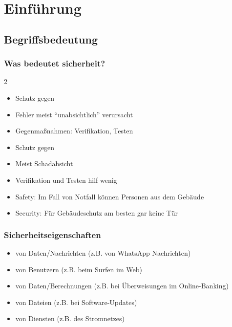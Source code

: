 \section{Einführung}
\subsection{Begriffsbedeutung}
\subsubsection*{Was bedeutet sicherheit?}
\begin{multicols}{2} %
    \begin{defBox}[title=\blockTitle{Betriebssicherheit / Safety}]
        \begin{itemize}
            \item Schutz gegen 
            \item Fehler meist \enquote{unabsichtlich} verursacht
            \item Gegenmaßnahmen: Verifikation, Testen
        \end{itemize}
    \end{defBox}

    \columnbreak %

    \begin{defBox}[title=\blockTitle{Angriffssicherheit / Security}]
        \begin{itemize}
            \item Schutz gegen 
            \item Meist Schadabsicht
            \item Verifikation und Testen hilf wenig
        \end{itemize}
    \end{defBox}
\end{multicols}

\begin{itemize}
    \item Safety: Im Fall von Notfall können Personen aus dem Gebäude
    \item Security: Für Gebäudeschutz am besten gar keine Tür
\end{itemize}
\subsubsection*{Sicherheitseigenschaften}
\begin{itemize}
    \item {} von Daten/Nachrichten (z.B. von WhatsApp Nachrichten)
    \item {} von Benutzern (z.B. beim Surfen im Web)
    \item {} von Daten/Berechnungen (z.B. bei Überweisungen im Online-Banking)
    \item {} von Dateien (z.B. bei Software-Updates)
    \item {} von Diensten (z.B. des Stromnetzes)
\end{itemize}
\clearpage
